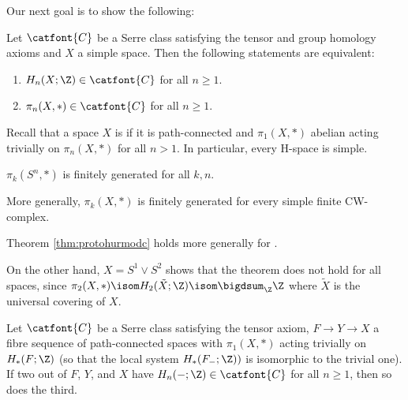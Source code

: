 Our next goal is to show the following:
\begin{theorem}\label{thm:protohurmodc}
	Let $\catfont{C}$ be a Serre class satisfying the tensor and group homology axioms and $X$ a simple space.
	Then the following statements are equivalent:
	\begin{enumerate}
		\item $H_n(X; \Z) \in \catfont{C}$ for all $n \geq 1$.
		\item $\pi_n(X, *) \in \catfont{C}$ for all $n \geq 1$.
	\end{enumerate}
\end{theorem}
Recall that a space $X$ is  if it is path-connected and $\pi_1(X, *)$ abelian acting trivially on $\pi_n(X, *)$ for all $n > 1$.
In particular, every H-space is simple.
\begin{corollary}\label{crl:htpygrpsofspheresfg}
	$\pi_k(S^n, *)$ is finitely generated for all $k, n$.
\end{corollary}
\begin{corollary}
	More generally, $\pi_k(X, *)$ is finitely generated for every simple finite CW-complex.
\end{corollary}
\begin{remark}
	Theorem \ref{thm:protohurmodc} holds more generally for .

	On the other hand, $X = S^1 \vee S^2$ shows that the theorem does not hold for all spaces, since $\pi_2(X, *) \isom H_2(\tilde{X}; \Z) \isom \bigdsum_{\Z} \Z$ where $\tilde{X}$ is the universal covering of $X$.
\end{remark}
\begin{lemma}\label{lmm:twointhreeserreclass}
	Let $\catfont{C}$ be a Serre class satisfying the tensor axiom, $F \to Y \to X$ a fibre sequence of path-connected spaces with $\pi_1(X, *)$ acting trivially on $H_*(F; \Z)$ (so that the local system $H_*(F_{-}; \Z))$ is isomorphic to the trivial one).
	If two out of $F$, $Y$, and $X$ have $H_n({{-}}; \Z) \in \catfont{C}$ for all $n \geq 1$, then so does the third.
\end{lemma}
